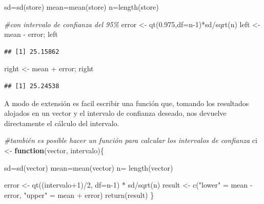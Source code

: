 \documentclass[
]{book}
\newenvironment{Shaded}{\begin{snugshade}}{\end{snugshade}}
\newcommand{\AttributeTok}[1]{\textcolor[rgb]{0.77,0.63,0.00}{#1}}
\newcommand{\CommentTok}[1]{\textcolor[rgb]{0.56,0.35,0.01}{\textit{#1}}}
\newcommand{\ControlFlowTok}[1]{\textcolor[rgb]{0.13,0.29,0.53}{\textbf{#1}}}
\newcommand{\DecValTok}[1]{\textcolor[rgb]{0.00,0.00,0.81}{#1}}
\newcommand{\FloatTok}[1]{\textcolor[rgb]{0.00,0.00,0.81}{#1}}
\newcommand{\FunctionTok}[1]{\textcolor[rgb]{0.00,0.00,0.00}{#1}}
\newcommand{\NormalTok}[1]{#1}
\newcommand{\OtherTok}[1]{\textcolor[rgb]{0.56,0.35,0.01}{#1}}
\newcommand{\SpecialCharTok}[1]{\textcolor[rgb]{0.00,0.00,0.00}{#1}}
\newcommand{\StringTok}[1]{\textcolor[rgb]{0.31,0.60,0.02}{#1}}
\begin{document}
\begin{Shaded}
\begin{Highlighting}[]
\NormalTok{sd}\OtherTok{=}\FunctionTok{sd}\NormalTok{(store)}
\NormalTok{mean}\OtherTok{=}\FunctionTok{mean}\NormalTok{(store)}
\NormalTok{n}\OtherTok{=}\FunctionTok{length}\NormalTok{(store)}

\CommentTok{\#con intervalo de confianza del 95\%}
\NormalTok{error }\OtherTok{\textless{}{-}} \FunctionTok{qt}\NormalTok{(}\FloatTok{0.975}\NormalTok{,}\AttributeTok{df=}\NormalTok{n}\DecValTok{{-}1}\NormalTok{)}\SpecialCharTok{*}\NormalTok{sd}\SpecialCharTok{/}\FunctionTok{sqrt}\NormalTok{(n)}
\NormalTok{left }\OtherTok{\textless{}{-}}\NormalTok{ mean }\SpecialCharTok{{-}}\NormalTok{ error; left}
\end{Highlighting}
\end{Shaded}

\begin{verbatim}
## [1] 25.15862
\end{verbatim}

\begin{Shaded}
\begin{Highlighting}[]
\NormalTok{right }\OtherTok{\textless{}{-}}\NormalTok{ mean }\SpecialCharTok{+}\NormalTok{ error; right}
\end{Highlighting}
\end{Shaded}

\begin{verbatim}
## [1] 25.24538
\end{verbatim}

A modo de extensión es facil escribir una función que, tomando los resultados alojados en un vector y el intervalo de confianza deseado, nos devuelve directamente el cálculo del intervalo.

\begin{Shaded}
\begin{Highlighting}[]
\CommentTok{\#también es posible hacer un función para calcular los intervalos de confianza}
\NormalTok{ci }\OtherTok{\textless{}{-}} \ControlFlowTok{function}\NormalTok{(vector, intervalo)\{}
  
\NormalTok{  sd}\OtherTok{=}\FunctionTok{sd}\NormalTok{(vector)}
\NormalTok{  mean}\OtherTok{=}\FunctionTok{mean}\NormalTok{(vector)}
\NormalTok{  n}\OtherTok{=} \FunctionTok{length}\NormalTok{(vector)}
  
\NormalTok{  error }\OtherTok{\textless{}{-}} \FunctionTok{qt}\NormalTok{((intervalo}\SpecialCharTok{+}\DecValTok{1}\NormalTok{)}\SpecialCharTok{/}\DecValTok{2}\NormalTok{, }\AttributeTok{df=}\NormalTok{n}\DecValTok{{-}1}\NormalTok{) }\SpecialCharTok{*}\NormalTok{ sd}\SpecialCharTok{/}\FunctionTok{sqrt}\NormalTok{(n)}
\NormalTok{  result }\OtherTok{\textless{}{-}} \FunctionTok{c}\NormalTok{(}\StringTok{"lower"} \OtherTok{=}\NormalTok{ mean }\SpecialCharTok{{-}}\NormalTok{ error, }\StringTok{"upper"} \OtherTok{=}\NormalTok{ mean }\SpecialCharTok{+}\NormalTok{ error)}
  \FunctionTok{return}\NormalTok{(result)}
\NormalTok{\}}
\end{Highlighting}
\end{Shaded}
\end{document}
